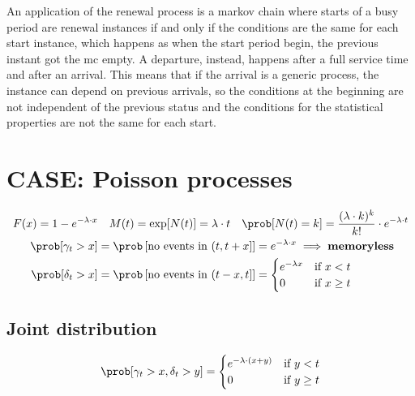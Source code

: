 An application of the renewal process is a markov chain where starts of a busy period are renewal instances if and only if
the conditions are the same for each start instance, which happens as when the start period begin, the previous instant got the mc empty.
A departure, instead, happens after a full service time and after an arrival. This means that if the arrival is a generic process, the instance
can depend on previous arrivals, so the conditions at the beginning are not independent of the previous status and the conditions
for the statistical properties are not the same for each start.

\section{CASE: Poisson processes}
\begin{equation}
	\begin{split}
		F(x)=1-e^{-\lambda \cdot x} &\quad M(t)=\exp[N(t)]=\lambda \cdot t \quad \prob[N(t)=k]=\frac{(\lambda \cdot k)^k}{k!}\cdot e^{-\lambda \cdot t}\\
		\prob[\gamma_t > x]&=\prob\left[\text{no events in } (t,t+x] \right]=e^{-\lambda \cdot x} \implies \text{\textbf{memoryless}}\\
		\prob[\delta_t > x] &= \prob \left[\text{no events in }(t-x,t] \right]=
		\begin{cases}
			e^{-\lambda x} & \text{if } x < t \\
			0 & \text{if } x \ge t\\
		\end{cases}
	\end{split}
\end{equation}

\subsection{Joint distribution}
\begin{equation}
	\prob[\gamma_t > x, \delta_t > y ] =
	\begin{cases}
		e^{-\lambda \cdot (x+y)} & \text{if } y < t \\
		0 & \text{if } y \ge t \\
	\end{cases}
\end{equation}

